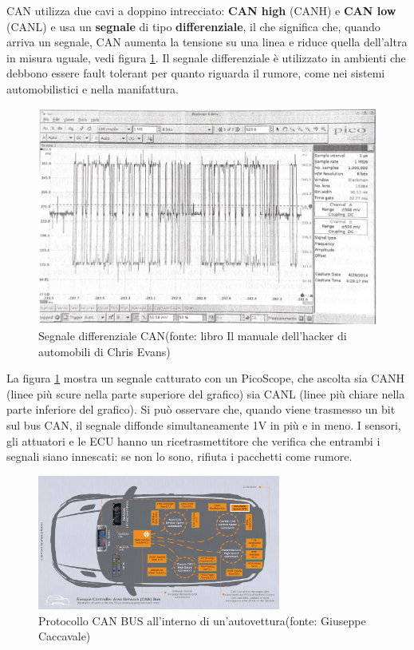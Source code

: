 \documentclass[12pt, a4paper, italian]{report}
\numberwithin{figure}{chapter}
\numberwithin{table}{chapter}
\begin{document}
\newpage

CAN utilizza due cavi a doppino intrecciato: \textbf{CAN high} (CANH) e \textbf{CAN low} (CANL) e usa un \textbf{segnale} di tipo \textbf{differenziale}, il che significa che, quando arriva un segnale, CAN aumenta la tensione su una linea e riduce quella dell'altra in misura uguale, vedi figura \ref{fig:segnaleDiffCAN}. Il segnale differenziale è utilizzato in ambienti che debbono essere fault tolerant per quanto riguarda il rumore, come nei sistemi automobilistici e nella manifattura.

\vspace{0.2cm}

\begin{figure}[h]
  \centering
  \includegraphics[width=13cm]{SegnaleDiffCAN.png}
  \caption{Segnale differenziale CAN\protect\footnotemark (fonte: libro Il manuale dell'hacker di automobili di Chris Evans)}
  \label{fig:segnaleDiffCAN}
\end{figure}

La figura \ref{fig:segnaleDiffCAN} mostra un segnale catturato con un PicoScope, che ascolta sia CANH (linee più scure nella parte superiore del grafico) sia CANL (linee più chiare nella parte inferiore del grafico). Si può osservare che, quando viene trasmesso un bit sul bus CAN, il segnale diffonde simultaneamente 1V in più e in meno. I sensori, gli attuatori e le ECU hanno un ricetrasmettitore che verifica che entrambi i segnali siano innescati: se non lo sono, rifiuta i pacchetti come rumore. 

\begin{figure}[h]
  \centering
  \includegraphics[width=8cm]{CAN_auto.png}
  \caption{Protocollo CAN BUS all'interno di un'autovettura\protect\footnotemark (fonte: Giuseppe Caccavale)}
  \label{fig:Protocallo CAN-BUS}
\end{figure}%
\end{document}
